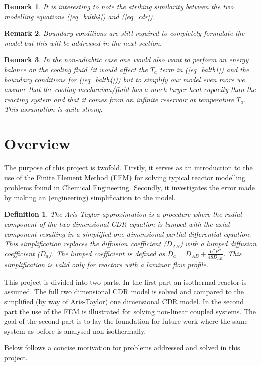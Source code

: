 \documentclass[11pt,fleqn]{article}
\theoremstyle{defstyle}
\newtheorem{defn}{Definition}[section]
\newtheorem{rmrk}{Remark}[section]
\begin{document}
\begin{rmrk}
It is interesting to note the striking similarity between the two modelling equations (\ref{eq_baltb4}) and (\ref{eq_cdr}).
\end{rmrk}
\begin{rmrk}
Boundary conditions are still required to completely formulate the model but this will be addressed in the next section.
\end{rmrk}
\begin{rmrk}
In the non-adiabtic case one would also want to perform an energy balance on the cooling fluid (it would affect the $T_a$ term in (\ref{eq_baltb1}) and the boundary conditions for (\ref{eq_baltb4})) but to simplify our model even more we assume that the cooling mechanism/fluid has a much larger heat capacity than the reacting system and that it comes from an infinite reservoir at temperature $T_a$. This assumption is quite strong.
\end{rmrk}

\section{Overview}
The purpose of this project is twofold. Firstly, it serves as an introduction to the use of the Finite Element Method (FEM) for solving typical reactor modelling problems found in Chemical Engineering. Secondly, it investigates the error made by making an (engineering) simplification to the model.
\begin{defn}
The Aris-Taylor approximation is a procedure where the radial component of the two dimensional CDR equation is lumped with the axial component resulting in a simplified one dimensional partial differential equation. This simplification replaces the diffusion coefficient ($D_{AB}$) with a lumped diffusion coefficient ($D_a$). The lumped coefficient is defined as $D_a = D_{AB} + \frac{U^2R^2}{48D_{AB}}$. This simplification is valid only for reactors with a laminar flow profile. 
\end{defn}
This project is divided into two parts. In the first part an isothermal reactor is assumed. The full two dimensional CDR model is solved and compared to the simplified (by way of Aris-Taylor) one dimensional CDR model. In the second part the use of the FEM is illustrated for solving non-linear coupled systems. The goal of the second part is to lay the foundation for future work where the same system as before is analysed non-isothermally.

Below follows a concise motivation for problems addressed and solved in this project. 
\end{document}
